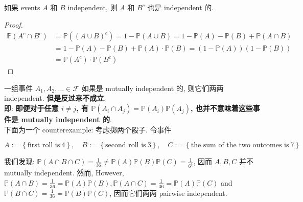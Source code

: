 \documentclass{qlnotes-export}
\begin{document}
\begin{proposition}\label{prop-01-combinatorics-prob-space-proposition-008}

如果 events \(A\) 和 \(B\) independent, 则 \(A\) 和 \(B^{c}\) 也是 independent 的.

\end{proposition}

\begin{proof}

\[\begin{matrix}
{{\mathbb{P}}\left( {A^{c} \cap B^{c}} \right)} & {= {\mathbb{P}}\left( {(A \cup B)^{c}} \right) = 1 - {\mathbb{P}}(A \cup B) = 1 - {\mathbb{P}}(A) - {\mathbb{P}}(B) + {\mathbb{P}}(A \cap B)} \\
 & {= 1 - {\mathbb{P}}(A) - {\mathbb{P}}(B) + {\mathbb{P}}(A) \cdot {\mathbb{P}}(B) = (1 - {\mathbb{P}}(A))(1 - {\mathbb{P}}(B))} \\
 & {= {\mathbb{P}}\left( A^{c} \right) \cdot {\mathbb{P}}\left( B^{c} \right)}
\end{matrix}\]

\end{proof}

\begin{example}\label{ex-01-combinatorics-prob-space-pairwise-independence-vs-mutual-independence}

一组事件 \(A_{1},A_{2},\ldots \in \mathcal{F}\) 如果是 mutually independent 的, 则它们两两 independent. \textbf{但是反过来不成立}.\\
即: \textbf{即便对于任意 \(i \neq j\), 有 \({\mathbb{P}}(A_{i} \cap A_{j}) = {\mathbb{P}}(A_{i}){\mathbb{P}}(A_{j})\), 也并不意味着这些事件是 mutually independent 的}.\\
下面为一个 counterexample: 考虑掷两个骰子. 令事件

\[A := \left\{ {\text{first roll is}\ 4} \right\},\quad B := \left\{ {\text{second roll is}\ 3} \right\},\quad C := \left\{ {\text{the sum of the two outcomes is}\ 7} \right\}\]

我们发现: \({\mathbb{P}}(A \cap B \cap C) = \frac{1}{36} \neq {\mathbb{P}}(A){\mathbb{P}}(B){\mathbb{P}}(C) = \frac{1}{6^{3}}\), 因而 \(A,B,C\) 并不 mutually independent. 然而, However, \({\mathbb{P}}(A \cap B) = \frac{1}{36} = {\mathbb{P}}(A){\mathbb{P}}(B),{\mathbb{P}}(A \cap C) = \frac{1}{36} = {\mathbb{P}}(A){\mathbb{P}}(C)\) and \({\mathbb{P}}(B \cap C) = \frac{1}{36} = {\mathbb{P}}(B){\mathbb{P}}(C)\), 因而它们两两 pairwise independent.

\end{example}
\end{document}
